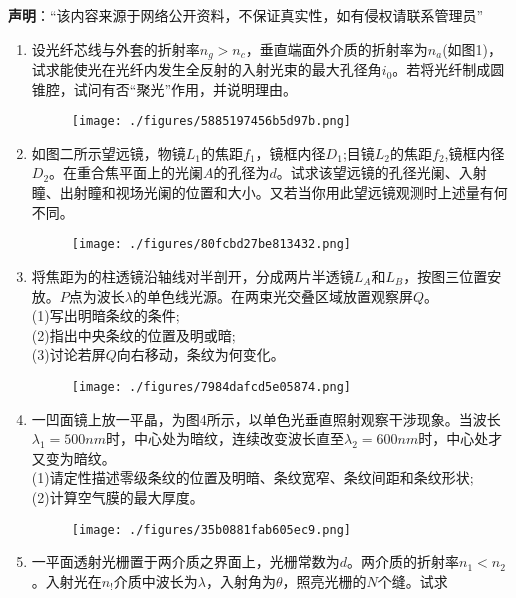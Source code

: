 
\textbf{声明}：“该内容来源于网络公开资料，不保证真实性，如有侵权请联系管理员”

\begin{enumerate}
\item 设光纤芯线与外套的折射率$n_g>n_c$，垂直端面外介质的折射率为$n_a$(如图1)，试求能使光在光纤内发生全反射的入射光束的最大孔径角$i_0$。若将光纤制成圆锥腔，试问有否“聚光”作用，并说明理由。
\begin{figure}[ht]
\centering
\texttt{[image: ./figures/5885197456b5d97b.png]}
\caption{} \label{fig_HGD00_1}
\end{figure}
\item 如图二所示望远镜，物镜$L_1$的焦距$f_1$，镜框内径$D_1$;目镜$L_2$的焦距$f_2$,镜框内径$D_2$。在重合焦平面上的光阑$A$的孔径为$d$。试求该望远镜的孔径光阑、入射瞳、出射瞳和视场光阑的位置和大小。又若当你用此望远镜观测时上述量有何不同。
\begin{figure}[ht]
\centering
\texttt{[image: ./figures/80fcbd27be813432.png]}
\caption{} \label{fig_HGD00_2}
\end{figure}
\item 将焦距为的柱透镜沿轴线对半剖开，分成两片半透镜$L_A$和$L_B$，按图三位置安放。$P$点为波长$\lambda$的单色线光源。在两束光交叠区域放置观察屏$Q$。\\
(1)写出明暗条纹的条件;\\
(2)指出中央条纹的位置及明或暗;\\
(3)讨论若屏$Q$向右移动，条纹为何变化。
\begin{figure}[ht]
\centering
\texttt{[image: ./figures/7984dafcd5e05874.png]}
\caption{} \label{fig_HGD00_3}
\end{figure}
\item 一凹面镜上放一平晶，为图4所示，以单色光垂直照射观察干涉现象。当波长$\lambda_1=500nm$时，中心处为暗纹，连续改变波长直至$\lambda_2=600nm$时，中心处才又变为暗纹。\\
(1)请定性描述零级条纹的位置及明暗、条纹宽窄、条纹间距和条纹形状;\\
(2)计算空气膜的最大厚度。
\begin{figure}[ht]
\centering
\texttt{[image: ./figures/35b0881fab605ec9.png]}
\caption{} \label{fig_HGD00_4}
\end{figure}
\item 一平面透射光栅置于两介质之界面上，光栅常数为$d$。两介质的折射率$n_1<n_2$。入射光在$n_!$介质中波长为$\lambda$，入射角为$\theta$，照亮光栅的$N$个缝。试求\\

\end{enumerate}
